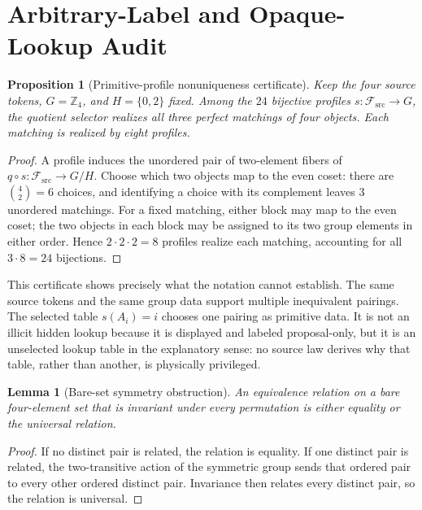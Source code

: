 \documentclass[11pt]{article}
\newtheorem{lemma}{Lemma}
\newtheorem{proposition}{Proposition}
\newcommand{\Fsrc}{\mathcal F_{\mathrm{src}}}
\begin{document}
\section{Arbitrary-Label and Opaque-Lookup Audit}

\begin{proposition}[Primitive-profile nonuniqueness certificate]
Keep the four source tokens, \(G=\mathbb Z_4\), and \(H=\{0,2\}\) fixed.
Among the \(24\) bijective profiles \(s:\Fsrc\to G\), the quotient selector
realizes all three perfect matchings of four objects.  Each matching is
realized by eight profiles.
\end{proposition}

\begin{proof}
A profile induces the unordered pair of two-element fibers of
\(q\circ s:\Fsrc\to G/H\).  Choose which two objects map to the even coset:
there are \(\binom42=6\) choices, and identifying a choice with its complement
leaves \(3\) unordered matchings.  For a fixed matching, either block may map
to the even coset; the two objects in each block may be assigned to its two
group elements in either order.  Hence \(2\cdot2\cdot2=8\) profiles realize
each matching, accounting for all \(3\cdot8=24\) bijections.
\end{proof}

This certificate shows precisely what the notation cannot establish.  The
same source tokens and the same group data support multiple inequivalent
pairings.  The selected table \(s(A_i)=i\) chooses one pairing as primitive
data.  It is not an illicit hidden lookup because it is displayed and labeled
proposal-only, but it is an unselected lookup table in the explanatory sense:
no source law derives why that table, rather than another, is physically
privileged.

\begin{lemma}[Bare-set symmetry obstruction]
An equivalence relation on a bare four-element set that is invariant under
every permutation is either equality or the universal relation.
\end{lemma}

\begin{proof}
If no distinct pair is related, the relation is equality.  If one distinct
pair is related, the two-transitive action of the symmetric group sends that
ordered pair to every other ordered distinct pair.  Invariance then relates
every distinct pair, so the relation is universal.
\end{proof}
\end{document}
